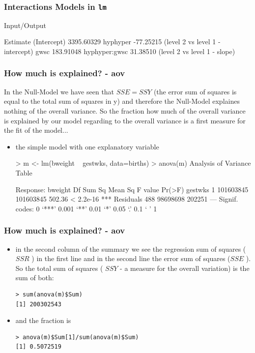 \documentclass[xcolor={table}]{beamer}
\begin{document}
\begin{frame}[fragile]\frametitle{Interactions Models in \texttt{lm}}
\begin{exampleblock}{Input/Output}
\begin{semiverbatim}
                Estimate
(Intercept)   3395.60329 
hyphyper       -77.25215 (level 2 vs level 1 - intercept)
gwsc           183.91048
hyphyper:gwsc   31.38510 (level 2 vs level 1 - slope)
\end{semiverbatim}
\end{exampleblock}
\end{frame}

\begin{frame}[fragile]\frametitle{How much is explained? - aov}
In the Null-Model we have seen that $SSE=SSY$ (the error sum of squares is equal to the total sum of squares in y) and therefore the Null-Model explaines nothing of the overall variance. So the fraction how much of the overall variance is explained by our model regarding to the overall variance is a first measure for the fit of the model...
\begin{itemize}
\item the simple model with one explanatory variable\small
\begin{semiverbatim}
> m <- lm(bweight ~ gestwks, data=births)
> anova(m)
Analysis of Variance Table

Response: bweight
           Df    Sum Sq   Mean Sq F value    Pr(>F)    
gestwks     1 101603845 101603845  502.36 < 2.2e-16 ***
Residuals 488  98698698    202251                      
---
Signif. codes:  0 ‘***’ 0.001 ‘**’ 0.01 ‘*’ 0.05 ‘.’ 0.1 ‘ ’ 1 
\end{semiverbatim}
\end{itemize}
\end{frame}


\begin{frame}[fragile]\frametitle{How much is explained? - aov}
\begin{itemize}
\item in the second column of the summary we see the regression sum of squares ( $SSR$ ) in the first line and in the second line the error sum of squares ($SSE$ ). So the total sum of squares ( $SSY$ - a measure for the overall variation) is the sum of both:
\begin{verbatim}
> sum(anova(m)$Sum)
[1] 200302543
\end{verbatim}
\item and the fraction is
\begin{verbatim}
> anova(m)$Sum[1]/sum(anova(m)$Sum)
[1] 0.5072519
\end{verbatim}
\end{itemize}
\end{frame}
\end{document}
